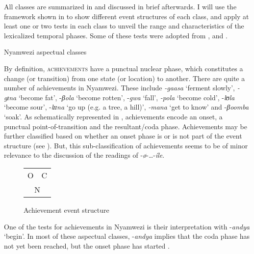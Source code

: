 \documentclass[output=paper,newtxmath,modfonts,nonflat,draftmode]{langsci/langscibook}
\begin{document}
All classes are summarized in  and discussed in brief afterwards. I will use the framework shown in  to show different event structures of each class, and apply at least one or two tests in each class to unveil the range and characteristics of the lexicalized temporal phases. Some of these tests were adopted from \citet{Kershner2002}, \citet{Crane2016} and \citet{Persohn2017b}.

\ea \label{ex:kanijo:8}
 Nyamwezi aspectual classes

\z

By definition, \textsc{achievements} have a punctual nuclear phase, which constitutes a change (or transition) from one state (or location) to another. There are quite a number of achievements in Nyamwezi. These include \textit{-gaasa} ‘ferment slowly’, \textit{-gɪ}\textit{na} ‘become fat’, -\textit{βola} ‘become rotten’, -\textit{gwa} ‘fall’, \textit{-pola} ‘become cold’, -\textit{lʊ}\textit{la} ‘become sour’, -\textit{lɪɪ}\textit{na} ‘go up (e.g. a tree, a hill)’, \textit{-mana} ‘get to know’ and -\textit{βoomba} ‘soak’. As schematically represented in , achievements encode an onset, a punctual point-of-transition and the resultant/coda phase. Achievements may be further classified based on whether an onset phase is or is not part of the event structure (see ). But, this sub-classification of achievements seems to be of minor relevance to the discussion of the readings of -\textit{ø}-\ldots-\textit{íle}.

\begin{figure}
\caption{Achievement event structure}
\begin{tabular}{c|c}
    \cline{1-2}
     O & C\\
    \cline{1-2}
    \multicolumn{2}{c}{N}\\
\end{tabular}
\label{fig:kanijo:5}
\end{figure} 

One of the tests for achievements in Nyamwezi is their interpretation with -\textit{andya} ‘begin’. In most of these aspectual classes, -\textit{andya} implies that the coda phase has not yet been reached, but the onset phase has started . 
\end{document}
